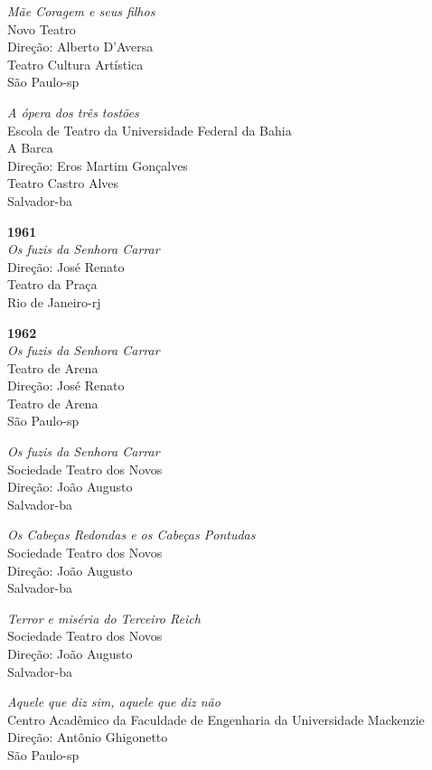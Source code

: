 {\it Mãe Coragem e seus filhos}\\
Novo Teatro\\
Direção: Alberto D'Aversa\\
Teatro Cultura Artística\\
São Paulo-{\sc sp}

{\it A ópera dos três tostões}\\
Escola de Teatro da Universidade Federal da Bahia\\
A Barca\\
Direção: Eros Martim Gonçalves\\
Teatro Castro Alves\\
Salvador-{\sc ba}

\item{\bf 1961}\\
{\it Os fuzis da Senhora Carrar}\\
Direção: José Renato\\
Teatro da Praça\\
Rio de Janeiro-{\sc rj}

\item{\bf 1962}\\
{\it Os fuzis da Senhora Carrar}\\
Teatro de Arena\\
Direção: José Renato\\
Teatro de Arena\\
São Paulo-{\sc sp}

{\it Os fuzis da Senhora Carrar}\\
Sociedade Teatro dos Novos\\
Direção: João Augusto\\
Salvador-{\sc ba}

{\it Os Cabeças Redondas e os Cabeças Pontudas}\\
Sociedade Teatro dos Novos\\
Direção: João Augusto\\
Salvador-{\sc ba}

{\it Terror e miséria do Terceiro Reich}\\
Sociedade Teatro dos Novos\\
Direção: João Augusto\\
Salvador-{\sc ba}

{\it Aquele que diz sim, aquele que diz não}\\
Centro Acadêmico da Faculdade de Engenharia da Universidade Mackenzie\\
Direção: Antônio Ghigonetto\\
São Paulo-{\sc sp}

